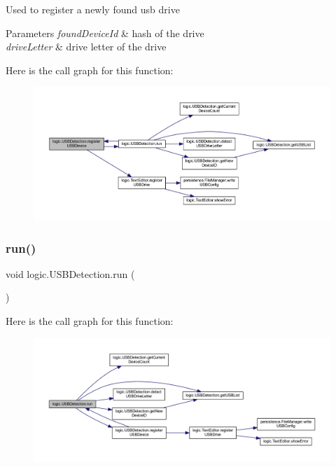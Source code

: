 Used to register a newly found usb drive 
\begin{DoxyParams}{Parameters}
{\em found\+Device\+Id} & hash of the drive \\
\hline
{\em drive\+Letter} & drive letter of the drive \\
\hline
\end{DoxyParams}
Here is the call graph for this function\+:\nopagebreak
\begin{figure}[H]
\begin{center}
\leavevmode
\includegraphics[width=350pt]{classlogic_1_1_u_s_b_detection_adfbfb167a4d6cc1a5cb186c0246b131a_cgraph}
\end{center}
\end{figure}
\mbox{\label{classlogic_1_1_u_s_b_detection_afa5927f03e8a15d8797c7448b2b56015}} 
\subsubsection{\texorpdfstring{run()}{run()}}
{\footnotesize\ttfamily void logic.\+U\+S\+B\+Detection.\+run (\begin{DoxyParamCaption}{ }\end{DoxyParamCaption})}

Here is the call graph for this function\+:\nopagebreak
\begin{figure}[H]
\begin{center}
\leavevmode
\includegraphics[width=350pt]{classlogic_1_1_u_s_b_detection_afa5927f03e8a15d8797c7448b2b56015_cgraph}
\end{center}
\end{figure}
\mbox{\label{classlogic_1_1_u_s_b_detection_aa9406feb1bb47a2ea840f352b960bfb8}} 
